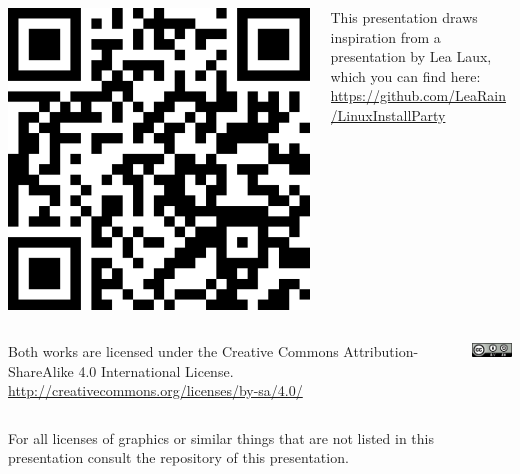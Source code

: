 \begin{frame}
	\begin{columns}%
		\begin{column}{\selfrefrightcolumn}%
			\includegraphics[width=\linewidth]{../graphics/lea_laux_presentation_qr_code.png}%
		\end{column}%
		\hfill%
		\begin{column}{\selfrefleftcolumn}%
			This presentation draws inspiration from a presentation by Lea Laux, which you can find here:\\[.2\baselineskip]%
			\url{https://github.com/LeaRain/LinuxInstallParty}%
		\end{column}%
	\end{columns}%
	
	\vfill%
	
	\begin{columns}%
		\begin{column}{\selfrefleftcolumn}%
			Both works are licensed under the Creative Commons Attribution-ShareAlike 4.0 International License.\\[.2\baselineskip]%
			\url{http://creativecommons.org/licenses/by-sa/4.0/}%
		\end{column}%
		\hfill%
		\begin{column}{\selfrefrightcolumn}%
			\centering\includegraphics[width=1.5cm]{../graphics/cc-by-sa.png}%
		\end{column}%
	\end{columns}%

	\vfill%
	
	\begin{columns}
		\begin{column}{\linewidth}
			For all licenses of graphics or similar things that are not listed in this presentation consult the repository of this presentation.
		\end{column}
		\hfill%
	\end{columns}
\end{frame}

